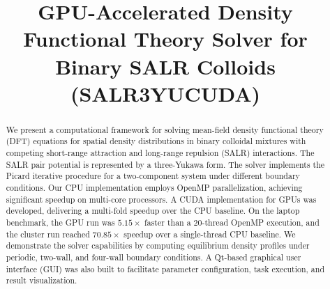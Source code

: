 \documentclass[conference]{IEEEtran}
\begin{document}
\title{GPU-Accelerated Density Functional Theory Solver for Binary SALR Colloids (SALR3YUCUDA)}

\author{
\and
{}
\and
{}
}

\maketitle

\begin{abstract}
We present a computational framework for solving mean-field density functional theory (DFT) equations for spatial density distributions in binary colloidal mixtures with competing short-range attraction and long-range repulsion (SALR) interactions. The SALR pair potential is represented by a three-Yukawa form. The solver implements the Picard iterative procedure for a two-component system under different boundary conditions. Our CPU implementation employs OpenMP parallelization, achieving significant speedup on multi-core processors. A CUDA implementation for GPUs was developed, delivering a multi-fold speedup over the CPU baseline. On the laptop benchmark, the GPU run was $5.15\times$ faster than a 20-thread OpenMP execution, and the cluster run reached $70.85\times$ speedup over a single-thread CPU baseline. We demonstrate the solver capabilities by computing equilibrium density profiles under periodic, two-wall, and four-wall boundary conditions. A Qt-based graphical user interface (GUI) was also built to facilitate parameter configuration, task execution, and result visualization.
\end{abstract}

\end{document}
